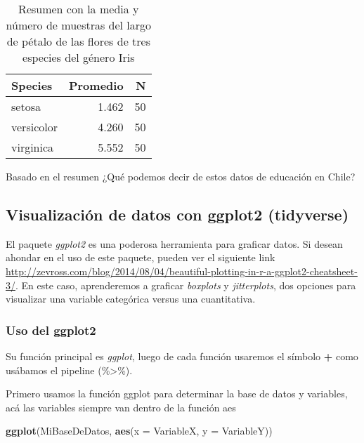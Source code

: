 \documentclass[]{book}
\newenvironment{Shaded}{\begin{snugshade}}{\end{snugshade}}
\newcommand{\DataTypeTok}[1]{\textcolor[rgb]{0.13,0.29,0.53}{#1}}
\newcommand{\KeywordTok}[1]{\textcolor[rgb]{0.13,0.29,0.53}{\textbf{#1}}}
\newcommand{\NormalTok}[1]{#1}
\begin{document}
\begin{table}[t]

\caption{\label{tab:MediaIris}Resumen con la media y número de muestras del largo de pétalo de las flores de tres especies del género Iris}
\centering
\begin{tabular}{lrr}
\toprule
Species & Promedio & N\\
\midrule
setosa & 1.462 & 50\\
versicolor & 4.260 & 50\\
virginica & 5.552 & 50\\
\bottomrule
\end{tabular}
\end{table}

Basado en el resumen ¿Qué podemos decir de estos datos de educación en Chile?

\hypertarget{visualizacion-de-datos-con-ggplot2-tidyverse}{%
\subsection{Visualización de datos con ggplot2 (tidyverse)}\label{visualizacion-de-datos-con-ggplot2-tidyverse}}

El paquete \emph{ggplot2} \citep{WickhamGG2016} es una poderosa herramienta para graficar datos. Si desean ahondar en el uso de este paquete, pueden ver el siguiente link \url{http://zevross.com/blog/2014/08/04/beautiful-plotting-in-r-a-ggplot2-cheatsheet-3/}. En este caso, aprenderemos a graficar \emph{boxplots} y \emph{jitterplots}, dos opciones para visualizar una variable categórica versus una cuantitativa.

\hypertarget{uso-del-ggplot2}{%
\subsubsection{Uso del ggplot2}\label{uso-del-ggplot2}}

Su función principal es \emph{ggplot}, luego de cada función usaremos el símbolo \textbf{+} como usábamos el pipeline (\%\textgreater{}\%).

Primero usamos la función ggplot para determinar la base de datos y variables, acá las variables siempre van dentro de la función aes

\begin{Shaded}
\begin{Highlighting}[]
\KeywordTok{ggplot}\NormalTok{(MiBaseDeDatos, }\KeywordTok{aes}\NormalTok{(}\DataTypeTok{x =}\NormalTok{ VariableX, }\DataTypeTok{y =}\NormalTok{ VariableY)) }
\end{Highlighting}
\end{Shaded}
\end{document}
